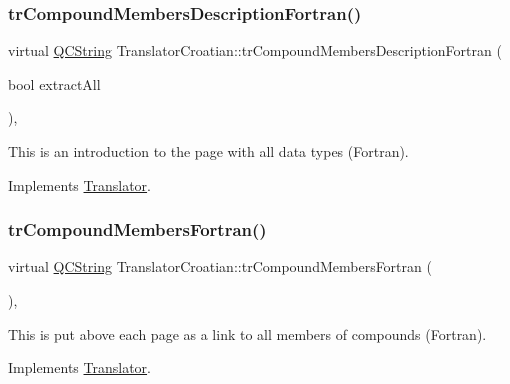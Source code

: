 \subsubsection{\texorpdfstring{trCompoundMembersDescriptionFortran()}{trCompoundMembersDescriptionFortran()}}
{\footnotesize\ttfamily virtual \mbox{\hyperlink{class_q_c_string}{Q\+C\+String}} Translator\+Croatian\+::tr\+Compound\+Members\+Description\+Fortran (\begin{DoxyParamCaption}\item[{bool}]{extract\+All }\end{DoxyParamCaption})\hspace{0.3cm}{\ttfamily [inline]}, {\ttfamily [virtual]}}

This is an introduction to the page with all data types (Fortran). 

Implements \mbox{\hyperlink{class_translator}{Translator}}.

\mbox{\label{class_translator_croatian_ac363f07c47837a9ca20179b9fd164c35}} 
\subsubsection{\texorpdfstring{trCompoundMembersFortran()}{trCompoundMembersFortran()}}
{\footnotesize\ttfamily virtual \mbox{\hyperlink{class_q_c_string}{Q\+C\+String}} Translator\+Croatian\+::tr\+Compound\+Members\+Fortran (\begin{DoxyParamCaption}{ }\end{DoxyParamCaption})\hspace{0.3cm}{\ttfamily [inline]}, {\ttfamily [virtual]}}

This is put above each page as a link to all members of compounds (Fortran). 

Implements \mbox{\hyperlink{class_translator}{Translator}}.

\mbox{\label{class_translator_croatian_a1bd0a40809c2703b5889e85efb06751a}} 
